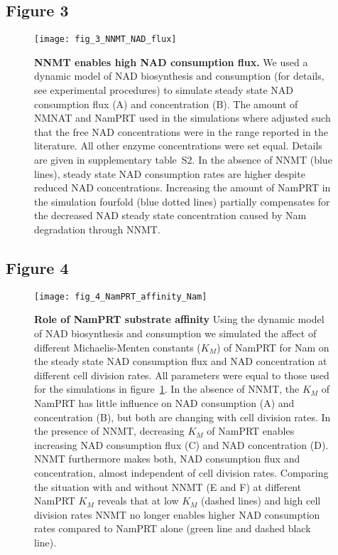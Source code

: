 \newpage


\subsection*{Figure 3}

\begin{figure}[ht]
  \centering
  \texttt{[image: fig\_3\_NNMT\_NAD\_flux]}
  \caption{\textbf{NNMT enables high NAD consumption flux.} We used a dynamic model of NAD biosynthesis and consumption (for details, see experimental procedures) to simulate steady state NAD  consumption flux  (A) and concentration (B). The amount of NMNAT and NamPRT used in the simulations where adjusted such that the free NAD concentrations were in the range reported in the literature. All other enzyme concentrations were set equal. Details are given in supplementary table~S2. In the absence of NNMT (blue lines), steady state NAD consumption rates are higher despite reduced NAD concentrations. Increasing the amount of NamPRT in the simulation fourfold (blue dotted lines) partially compensates for the decreased NAD steady state concentration caused by Nam degradation through NNMT.}
  \label{fig:NNMT_NAD_flux}
\end{figure}

\newpage


\subsection*{Figure 4}

\begin{figure}[ht]
  \centering
  \texttt{[image: fig\_4\_NamPRT\_affinity\_Nam]}
  \caption{\textbf{Role of NamPRT substrate affinity} Using the dynamic model of NAD biosynthesis and consumption we simulated the affect of different Michaelis-Menten constants ($K_{M}$) of NamPRT for Nam on the steady state NAD consumption flux and NAD concentration at different cell division rates. All parameters were equal to those used for the simulations in figure~\ref{fig:NNMT_NAD_flux}. In the absence of NNMT, the $K_{M}$ of NamPRT has little influence on NAD consumption (A) and concentration (B), but both are changing with cell division rates. In the presence of NNMT, decreasing $K_{M}$ of NamPRT enables increasing NAD consumption flux (C) and NAD concentration (D). NNMT furthermore makes both, NAD consumption flux and concentration, almost independent of cell division rates. Comparing the situation with and without NNMT (E and F) at different NamPRT $K_{M}$ reveals that at low $K_{M}$ (dashed lines) and high cell division rates NNMT no longer enables higher NAD consumption rates compared to NamPRT alone (green line and dashed black line).}
  \label{fig:NamPRT_affinity_Nam}
\end{figure}

